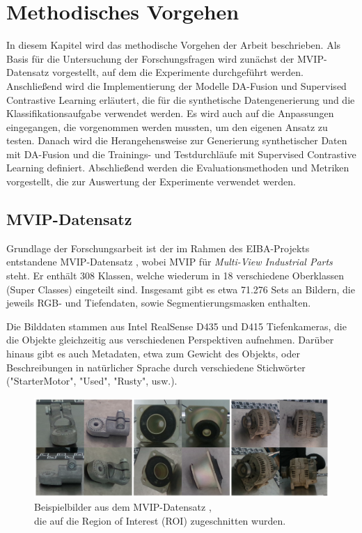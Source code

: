 \chapter{Methodisches Vorgehen}

In diesem Kapitel wird das methodische Vorgehen der Arbeit beschrieben. Als Basis für die Untersuchung der Forschungsfragen wird zunächst der MVIP-Datensatz vorgestellt, auf dem die Experimente durchgeführt werden. Anschließend wird die Implementierung der Modelle DA-Fusion und Supervised Contrastive Learning erläutert, die für die synthetische Datengenerierung und die Klassifikationsaufgabe verwendet werden. Es wird auch auf die Anpassungen eingegangen, die vorgenommen werden mussten, um den eigenen Ansatz zu testen. Danach wird die Herangehensweise zur Generierung synthetischer Daten mit DA-Fusion und die Trainings- und Testdurchläufe mit Supervised Contrastive Learning definiert. Abschließend werden die Evaluationsmethoden und Metriken vorgestellt, die zur Auswertung der Experimente verwendet werden.

\section{MVIP-Datensatz} \label{sec:dataset}

Grundlage der Forschungsarbeit ist der im Rahmen des EIBA-Projekts entstandene MVIP-Datensatz \parencite{Koch2023mvip}, wobei MVIP für \textit{Multi-View Industrial Parts} steht. Er enthält 308 Klassen, welche wiederum in 18 verschiedene Oberklassen (Super Classes) eingeteilt sind. Insgesamt gibt es etwa 71.276 Sets an Bildern, die jeweils RGB- und Tiefendaten, sowie Segmentierungsmasken enthalten.

Die Bilddaten stammen aus Intel RealSense D435 und D415 Tiefenkameras, die die Objekte gleichzeitig aus verschiedenen Perspektiven aufnehmen. Darüber hinaus gibt es auch Metadaten, etwa zum Gewicht des Objekts, oder Beschreibungen in natürlicher Sprache durch verschiedene Stichwörter ("StarterMotor", "Used", "Rusty", usw.).

\begin{figure}[]
	\centering
	\includegraphics[width=\textwidth]{figure_mvip_ex_cropped_2.png}
	\caption{Beispielbilder aus dem MVIP-Datensatz \parencite{Koch2023mvip},\\
	die auf die Region of Interest (ROI) zugeschnitten wurden.}
	\label{fig:mvip-examples}
\end{figure}

